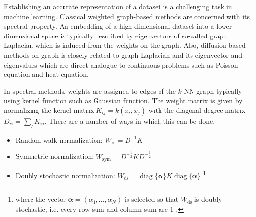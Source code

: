 \documentclass{article}
\newcommand{\R}{\mathbb{R}}
\newcommand{\half}{\frac{1}{2}}
\newcommand{\diag}[1]{\operatorname{diag}\{#1\}}
\newcommand{\red}[1]{\textcolor{red}{#1}}
\newcommand{\blue}[1]{\textcolor{blue}{#1}}
\begin{document}
Establishing an accurate representation of a dataset is a challenging task in machine learning. Classical weighted graph-based methods are concerned with its spectral property. 
An embedding of a high dimensional dataset into a lower dimensional space is typically described by eigenvectors of so-called graph Laplacian which is induced from the weights on the graph. 
Also, diffusion-based methods on graph is closely related to graph-Laplacian and its eigenvector and eigenvalues which are direct analogue to continuous problems such as Poisson equation and heat equation.


In spectral methods, weights are assigned to edges of the  $k$-NN graph typically using kernel function such as Gaussian function. 
The weight matrix is given by normalizing the kernel matrix $K_{ij} = k(x_i, x_j)$ with the diagonal degree matrix $D_{ii} = \sum_j K_{ij}.$  There are a number of ways in which this can be done.
\begin{itemize}
    \item Random walk normalization: 
    $W_{\text{rs}} = D^{-1} K$
    \item Symmetric normalization:
    $W_{\text{sym}} = D^{-\half} K D^{-\half}$
    \item Doubly stochastic normalization:
    $W_{\text{ds}} = \diag{\mathbf{\alpha}} K \diag{\mathbf{\alpha}}$
    \footnote{
    where the vector $\mathbf{\alpha} = (\alpha_1, \ldots, \alpha_N)$ is selected so that $W_{\text{ds}}$ is doubly-stochastic, i.e. every row-sum and column-sum are 1 \cite{landa2021doubly}.}
\end{itemize}
\end{document}
